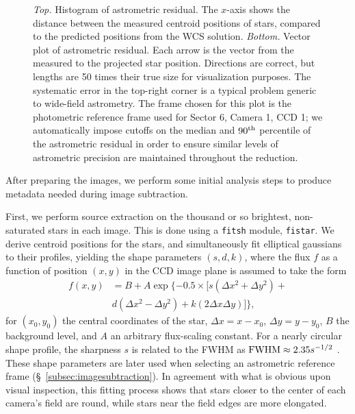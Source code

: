 \documentclass[12pt,twocolumn,tighten]{aastex62}
\begin{document}
\begin{figure}[!t]
	\vspace{-0.8cm}
	\vspace{-0.8cm}
    \caption{
		{\it Top.} Histogram of astrometric residual. The $x$-axis shows 
		the distance between the measured centroid positions of stars, 
		compared to the predicted positions from the WCS solution.
    {\it Bottom.} Vector plot of astrometric residual. Each arrow is
    the vector from the measured to the projected star position.
    Directions are correct, but lengths are 50 times their true size
    for visualization purposes.  The systematic error in the top-right
    corner is a typical problem generic to wide-field astrometry.  The
    frame chosen for this plot is the photometric reference frame used
    for Sector 6, Camera 1, CCD 1; we automatically impose cutoffs on
    the median and $90^{\rm th}$ percentile of the astrometric
    residual in order to ensure similar levels of astrometric
    precision are maintained throughout the reduction.
	}
	\label{fig:astromresid}
\end{figure}

After preparing the images, we perform some initial analysis steps to
produce metadata needed during image subtraction.  

First, we perform source extraction on the thousand or so brightest,
non-saturated stars in each image.  This is done using a
\texttt{fitsh} module, \texttt{fistar}.  We derive centroid positions
for the stars, and simultaneously fit elliptical gaussians to their
profiles, yielding the shape parameters $(s,d,k)$, where the flux $f$
as a function of position $(x,y)$ in the CCD image plane is assumed to
take the form
\begin{align}
  f(x,y) &= B + A \exp \{ -0.5 \times [
    s(\Delta x^2 + \Delta y^2) + \\
    \nonumber
    &d(\Delta x^2 - \Delta y^2) +
    k(2\Delta x \Delta y)
  ]  \},
\end{align}
for $(x_0,y_0)$ the central coordinates of the star, $\Delta x =
x-x_0$, $\Delta y = y - y_0$, $B$ the background level, and $A$ an
arbitrary flux-scaling constant.  For a nearly circular shape profile,
the sharpness $s$ is related to the FWHM as ${\rm FWHM} \approx
2.35s^{-1/2}$ \citep[{\it e.g.},][]{Pal_2009}.  These shape parameters
are later used when selecting an astrometric reference frame
(\S~\ref{subsec:imagesubtraction}).  In agreement with what is obvious
upon visual inspection, this fitting process shows that stars closer
to the center of each camera's field are round, while stars near the
field edges are more elongated.
\end{document}

